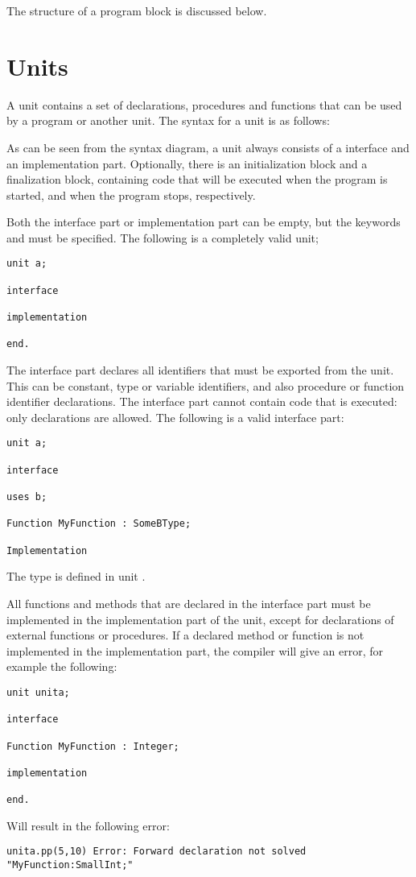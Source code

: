 The structure of a program block is discussed below.

\section{Units}
A unit contains a set of declarations, procedures and functions that can be
used by a program or another unit.
The syntax for a unit is as follows:

As can be seen from the syntax diagram, a unit always consists of a
interface and an implementation part. Optionally, there is an initialization
block and a finalization block, containing code that will be executed when
the program is started, and when the program stops, respectively.

Both the interface part or implementation part can be empty, but the
keywords  and  must be specified.
The following is a completely valid unit;
\begin{verbatim}
unit a;

interface

implementation

end.
\end{verbatim}

The interface part declares all identifiers that must be exported from the
unit. This can be constant, type or variable identifiers, and also procedure
or function identifier declarations.  The interface part cannot contain code
that is executed: only declarations are allowed. The following is a valid
interface part:
\begin{verbatim}
unit a;

interface

uses b;

Function MyFunction : SomeBType;

Implementation
\end{verbatim}
The type  is defined in unit .

All functions and methods that are declared in the interface part must
be implemented in the implementation part of the unit, except for
declarations of external functions or procedures. If a declared method
or function is not implemented in the implementation part, the compiler
will give an error, for example the following:
\begin{verbatim}
unit unita;

interface

Function MyFunction : Integer;

implementation

end.
\end{verbatim}
Will result in the following error:
\begin{verbatim}
unita.pp(5,10) Error: Forward declaration not solved "MyFunction:SmallInt;"
\end{verbatim}

